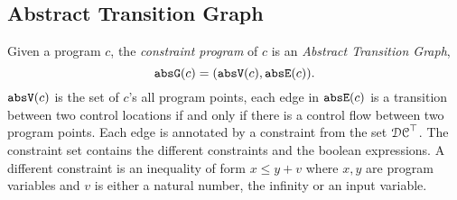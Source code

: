 \subsection{Abstract Transition Graph}
\label{sec:abs_prog}
Given a program $c$, the \emph{constraint program} of $c$ is an \emph{Abstract Transition Graph},
\[\mathtt{abs}{\mathtt{G}}(c) =(\mathtt{abs}{\mathtt{V}}(c), \mathtt{abs}{\mathtt{E}}(c)).\]
%
$\mathtt{abs}{\mathtt{V}}(c)$ is the set of $c$'s all program points,
each edge in $\mathtt{abs}{\mathtt{E}}(c)$ is a transition
between two control locations if and only if there is a control flow between two program points.
Each edge is annotated by a constraint
from the set $\mathcal{DC}^{\top}$.
The constraint set contains the different constraints and the boolean expressions. 
A different constraint is an inequality of form $x \leq y + v$ where 
$x, y$ are program variables and $v$ is either a 
natural number, the infinity or an input variable. 

